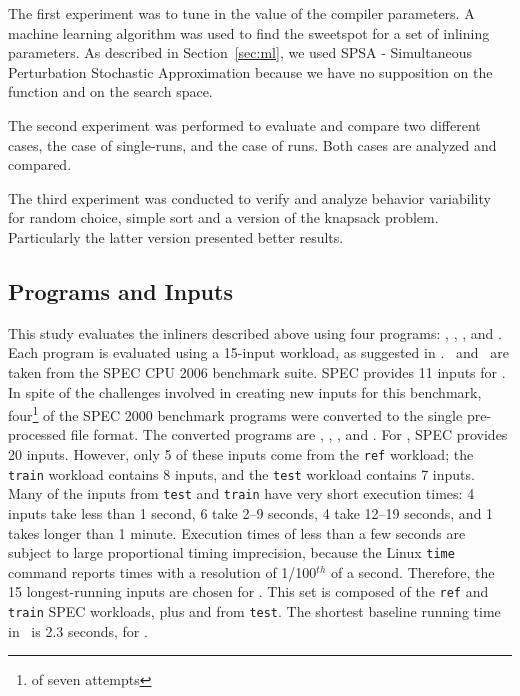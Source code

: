 
\def\graphwidth{0.9\linewidth}



The first experiment was to tune in the value of the compiler parameters.
 A machine learning algorithm was used to find the sweetspot for a set of
 inlining parameters. As described in Section~\ref{sec:ml}, we used
 SPSA - Simultaneous Perturbation Stochastic Approximation because we have no
 supposition on the function and on the search space.

The second experiment was performed to evaluate and compare two different cases,
 the case of single-runs, and the case of \CP\-runs. Both cases are analyzed and
 compared.

The third experiment was conducted to verify and 
  analyze behavior variability for random choice, simple sort and
  a version of the knapsack problem. Particularly the latter version presented better results.

\subsection{Programs and Inputs}


This study evaluates the inliners described above using four
programs: \bzip, \gzip, \gcc, and \gobmk.  Each program is evaluated
using a 15-input workload, as suggested
in \cite{BerubePhD}.  \Gcc\ and \gobmk\ are taken from the
SPEC CPU 2006 benchmark suite.  SPEC provides 11 inputs for \gcc.  In
spite of the challenges involved in creating new inputs for this
benchmark, four\footnote{of seven attempts} of the SPEC 2000 benchmark
programs were converted to the single pre-processed file format.  The
converted programs are \bzip, \lbm, \mcf, and \parser.  For \gobmk,
SPEC provides 20 inputs.  However, only 5 of these inputs come from
the {\tt ref} workload; the {\tt train} workload contains 8 inputs,
and the {\tt test} workload contains 7 inputs.  Many of the inputs from
{\tt test} and {\tt train} have very short execution times: 4 inputs
take less than 1 second, 6 take 2--9 seconds, 4 take 12--19 seconds,
and 1 takes longer than 1 minute.  Execution times of less than a few
seconds are subject to large proportional timing imprecision, because
the Linux {\tt time} command reports times with a resolution of
1/100$^{th}$ of a second.  Therefore, the 15 longest-running inputs
are chosen for \Wfull.  This set is composed of the {\tt ref} and {\tt
train} SPEC workloads, plus  and  from
{\tt test}.  The shortest baseline running time in \Wfull\ is 2.3
seconds, for .


